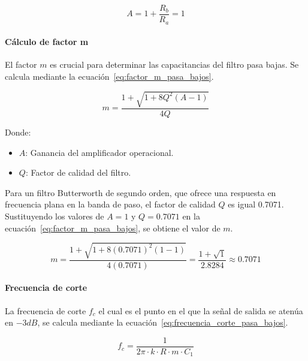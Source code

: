             \begin{equation}
                \label{eq:funcion_amplificador_operacional_pasa_bajos}
                A = 1 + \frac{R_b}{R_a} = 1
            \end{equation}

            \paragraph{Cálculo de factor m}
            El factor $m$ es crucial para determinar las capacitancias del filtro pasa bajas. Se calcula mediante la ecuación~\ref{eq:factor_m_pasa_bajos}.

            \begin{equation}
                \label{eq:factor_m_pasa_bajos}
                m = \frac{1+\sqrt{1+8Q^2(A-1)}}{4Q}
            \end{equation}

            Donde:

            \begin{itemize}
                \item $A$: Ganancia del amplificador operacional.
                \item $Q$: Factor de calidad del filtro.
            \end{itemize}

            Para un filtro Butterworth de segundo orden, que ofrece una respuesta en frecuencia plana en la banda de paso, el factor de calidad $Q$ es igual 0.7071. Sustituyendo los valores de $A = 1$ y $Q = 0.7071$ en la ecuación~\ref{eq:factor_m_pasa_bajos}, se obtiene el valor de $m$.

            \begin{equation}
                \label{eq:factor_m_pasa_bajos_valor}
                m = \frac{1+\sqrt{1+8(0.7071)^2(1-1)}}{4(0.7071)} = \frac{1 + \sqrt{1}}{2.8284}\approx 0.7071
            \end{equation}

            \paragraph{Frecuencia de corte}
            La frecuencia de corte $f_c$ el cual es el punto en el que la señal de salida se atenúa en $-3 dB$, se calcula mediante la ecuación~\ref{eq:frecuencia_corte_pasa_bajos}.

            \begin{equation}
                \label{eq:frecuencia_corte_pasa_bajos}
                f_c = \frac{1}{2\pi \cdot k \cdot R \cdot m \cdot C_1}
            \end{equation}

